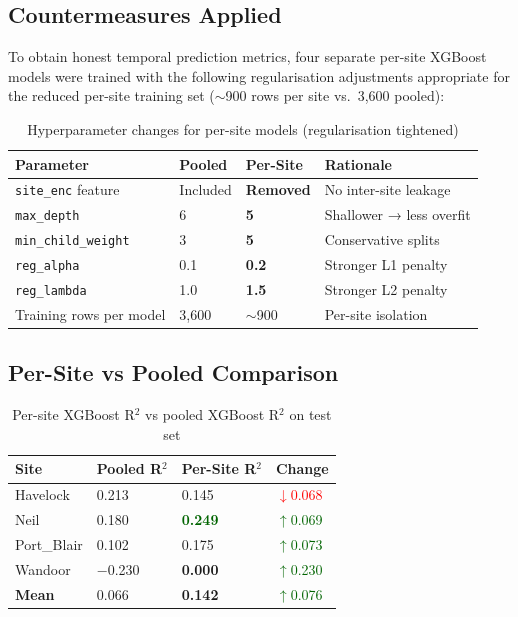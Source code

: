 \documentclass[12pt,a4paper]{report}
\begin{document}
\subsection{Countermeasures Applied}

To obtain honest temporal prediction metrics, four separate per-site XGBoost models
were trained with the following regularisation adjustments appropriate for the reduced
per-site training set ($\sim$900 rows per site vs.\ 3,600 pooled):

\begin{table}[H]
\centering
\caption{Hyperparameter changes for per-site models (regularisation tightened)}
\begin{tabular}{L{4cm}C{3cm}C{3cm}L{3.5cm}}
\toprule
\textbf{Parameter} & \textbf{Pooled} & \textbf{Per-Site} & \textbf{Rationale} \\
\midrule
{}
\texttt{site\_enc} feature & Included & \textbf{Removed} & No inter-site leakage \\
\texttt{max\_depth}        & 6         & \textbf{5}       & Shallower → less overfit \\
\texttt{min\_child\_weight} & 3        & \textbf{5}       & Conservative splits \\
\texttt{reg\_alpha}         & 0.1      & \textbf{0.2}     & Stronger L1 penalty \\
\texttt{reg\_lambda}        & 1.0      & \textbf{1.5}     & Stronger L2 penalty \\
Training rows per model    & 3,600    & $\sim$900        & Per-site isolation \\
\bottomrule
\end{tabular}
\label{tab:hyperchange}
\end{table}

\subsection{Per-Site vs Pooled Comparison}

\begin{table}[H]
\centering
\caption{Per-site XGBoost R$^2$ vs pooled XGBoost R$^2$ on test set}
\begin{tabular}{L{4cm}R{3cm}R{3cm}R{3cm}}
\toprule
\textbf{Site} & \textbf{Pooled R$^2$} & \textbf{Per-Site R$^2$} & \textbf{Change} \\
\midrule
{}
Havelock    & 0.213 & 0.145 & \textcolor{red}{$\downarrow$0.068} \\
Neil        & 0.180 & \textcolor{darkgreen}{\textbf{0.249}} & \textcolor{darkgreen}{$\uparrow$0.069} \\
Port\_Blair  & 0.102 & 0.175 & \textcolor{darkgreen}{$\uparrow$0.073} \\
Wandoor     & $-$0.230 & \textbf{0.000} & \textcolor{darkgreen}{$\uparrow$0.230} \\
\midrule
{}
\textbf{Mean} & 0.066 & \textbf{0.142} & \textcolor{darkgreen}{$\uparrow$0.076} \\
\bottomrule
\end{tabular}
\label{tab:persite_compare}
\end{table}
\end{document}
